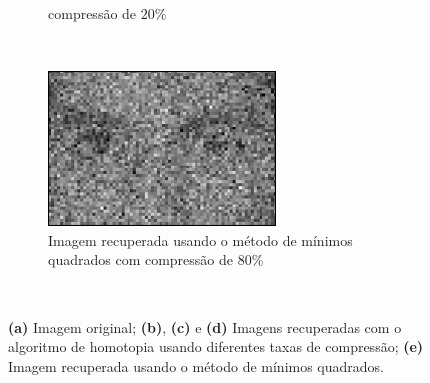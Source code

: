 \begin{figure}
\begin{subfigure}[b]{0.4\textwidth}
        \caption{compressão de $20\%$}
	    \label{fig:homotopy_80porc}
    \end{subfigure}\\
    \begin{subfigure}[b]{0.4\textwidth}
        \centering
        \includegraphics[scale=1]{imagens/homotopy/80porcentoMMQ.png}
        \caption{Imagem recuperada usando o método de mínimos quadrados com compressão de $80\%$}
	    \label{fig:MMQ_80porc}
    \end{subfigure}\\
    \caption{{\bf (a)} Imagem original; {\bf (b)}, {\bf(c)} e {\bf (d)} Imagens recuperadas com o algoritmo de homotopia usando diferentes taxas de compressão; {\bf (e)} Imagem recuperada usando o método de mínimos quadrados.}
    \label{fig:homotopy}
\end{figure}